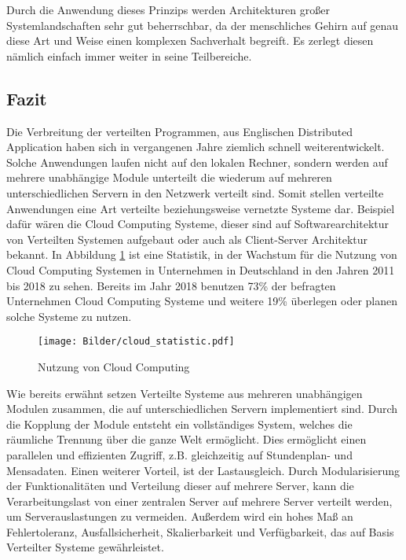 Durch die Anwendung dieses Prinzips werden Architekturen großer Systemlandschaften sehr gut beherrschbar, da der menschliches Gehirn auf genau diese Art und Weise einen komplexen Sachverhalt begreift. Es zerlegt diesen nämlich einfach immer weiter in seine Teilbereiche.

\subsection{Fazit}
Die Verbreitung der verteilten Programmen, aus Englischen Distributed Application haben sich in vergangenen Jahre ziemlich schnell weiterentwickelt. Solche Anwendungen laufen nicht auf den lokalen Rechner, sondern werden auf mehrere unabhängige Module unterteilt die wiederum auf mehreren unterschiedlichen Servern in den Netzwerk verteilt sind. Somit stellen verteilte Anwendungen eine Art verteilte beziehungsweise vernetzte Systeme dar. 
Beispiel dafür wären die Cloud Computing Systeme, dieser sind auf Softwarearchitektur von Verteilten Systemen aufgebaut oder auch als Client-Server Architektur bekannt. In Abbildung \ref{fig:cloud_statistic} ist eine Statistik, in der Wachstum für die Nutzung von Cloud Computing Systemen in Unternehmen in Deutschland in den Jahren 2011 bis 2018 zu sehen. Bereits im Jahr 2018 benutzen 73\% der befragten Unternehmen Cloud Computing Systeme und weitere 19\% überlegen oder planen solche Systeme zu nutzen.

\begin{figure}[H]
\centering
\texttt{[image: Bilder/cloud\_statistic.pdf]}
\caption{Nutzung von Cloud Computing\label{fig:cloud_statistic}}
\end{figure}

Wie bereits erwähnt setzen Verteilte Systeme aus mehreren unabhängigen Modulen zusammen, die auf unterschiedlichen Servern implementiert sind. Durch die Kopplung der Module entsteht ein vollständiges System, welches die räumliche Trennung über die ganze Welt ermöglicht. Dies ermöglicht einen parallelen und effizienten Zugriff, z.B. gleichzeitig auf Stundenplan- und Mensadaten. Einen weiterer Vorteil, ist der Lastausgleich. Durch Modularisierung der Funktionalitäten und Verteilung dieser auf mehrere Server, kann die Verarbeitungslast von einer zentralen Server auf mehrere Server verteilt werden, um Serverauslastungen zu vermeiden. Außerdem wird ein hohes Maß an Fehlertoleranz, Ausfallsicherheit, Skalierbarkeit und Verfügbarkeit, das auf Basis Verteilter Systeme gewährleistet.

